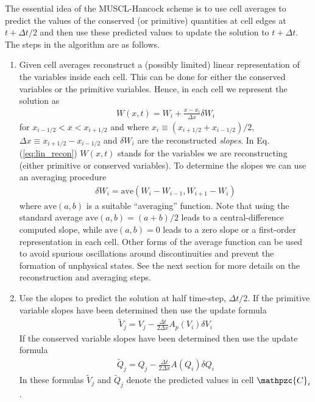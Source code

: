 \documentclass[11pt, reqno]{amsart}
\newcommand{\eqr}[1]{Eq.\thinspace(#1)}
\newcommand{\script}[1]{\mathpzc{#1}}
\theoremstyle{definition}
\begin{document}
The essential idea of the MUSCL-Hancock scheme is to use cell averages
to predict the values of the conserved (or primitive) quantities at
cell edges at $t+\Delta t/2$ and then use these predicted values to
update the solution to $t+\Delta t$. The steps in the algorithm are as
follows.
\begin{enumerate}

\item Given cell averages reconstruct a (possibly limited) linear
  representation of the variables inside each cell. This can be done
  for either the conserved variables or the primitive
  variables. Hence, in each cell we represent the solution as
  \begin{align}
    W(x,t) = W_i + \frac{x-x_i}{\Delta x}\delta W_i \label{eq:lin_recon}
  \end{align}
  for $x_{i-1/2}<x<x_{i+1/2}$ and where $x_i \equiv
  (x_{i+1/2}+x_{i-1/2})/2$, $\Delta x \equiv x_{i+1/2}-x_{i-1/2}$ and
  $\delta W_i$ are the reconstructed \emph{slopes}. In
  \eqr{\ref{eq:lin_recon}} $W(x,t)$ stands for the variables we are
  reconstructing (either primitive or conserved variables). To
  determine the slopes we can use an averaging procedure
  \begin{align}
    \delta W_i = \mathrm{ave}(W_i-W_{i-1}, W_{i+1}-W_i) \label{eqn:slope_recon}
  \end{align}
  where $\mathrm{ave}(a, b)$ is a suitable ``averaging''
  function. Note that using the standard average $\mathrm{ave}(a, b) =
  (a+b)/2$ leads to a central-difference computed slope, while
  $\mathrm{ave}(a, b) = 0$ leads to a zero slope or a first-order
  representation in each cell. Other forms of the average function can
  be used to avoid spurious oscillations around discontinuities and
  prevent the formation of unphysical states. See the next section for
  more details on the reconstruction and averaging steps.
  
\item Use the slopes to predict the solution at half time-step,
  $\Delta t/2$. If the primitive variable slopes have been determined
  then use the update formula
  \begin{align}
    \tilde{V}_j = V_j -\frac{\Delta t}{2 \Delta x} A_p(V_i) \delta V_i
  \end{align}
  If the conserved variable slopes have been determined then use the
  update formula
  \begin{align}
    \tilde{Q}_j = Q_j -\frac{\Delta t}{2 \Delta x} A(Q_i) \delta Q_i
  \end{align}
  In these formulas $\tilde{V}_j$ and $\tilde{Q}_j$ denote the
  predicted values in cell $\script{C}_i$.


\end{enumerate}
\end{document}
